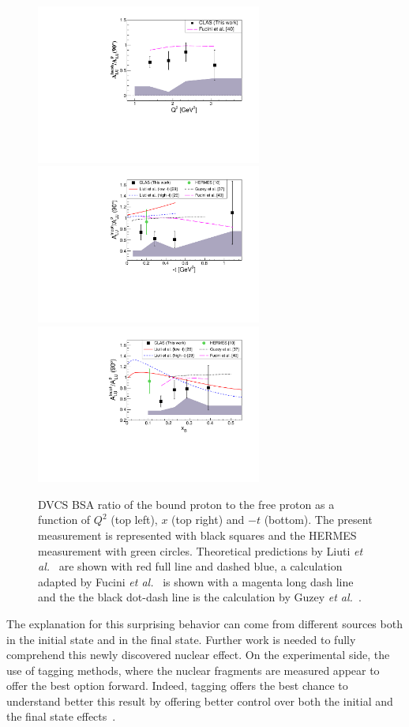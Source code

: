 \documentclass{article}
\begin{document}
\begin{figure}[tbp!]
\center
\includegraphics[width=7.4cm]{fig3/ALU_ratioInc_Q2_shortscenrario.pdf}
\includegraphics[width=7.4cm]{fig3/ALU_ratioInc_t_shortscenrario.pdf}
\includegraphics[width=7.4cm]{fig3/ALU_ratioInc_x_shortscenrario.pdf}
	\caption{DVCS BSA ratio of the bound proton to the free proton as a function of 
	$Q^2$ (top left), $x$ (top right) and $-t$ (bottom). The present measurement is 
	represented with black squares and the HERMES 
	measurement \cite{Airapetian:2009cga} with green circles. Theoretical predictions 
	by Liuti {\it et al.}~\cite{Liuti:2005gi,GonzalezHernandez:2012jv} are shown 
	with red full line and dashed blue, a calculation adapted by Fucini 
	{\it et al.}~\cite{Fucini:2019xlc} is shown with a magenta long dash line and the
	the black dot-dash line is the calculation by Guzey {\it et al.}~\cite{Guzey:2008th}.}
\label{fig:IncRatios}
\end{figure}

The explanation for this surprising behavior can come from different sources
both in the initial state and in the final state. 
Further work is needed to fully comprehend this newly discovered nuclear effect. On the 
experimental side, the use of tagging methods, where the nuclear fragments are measured
appear to offer the best option forward. Indeed, tagging offers the best chance to understand better
this result by offering better control over both the initial and the final state 
effects~\cite{Dupre:2015jha}.
\end{document}

